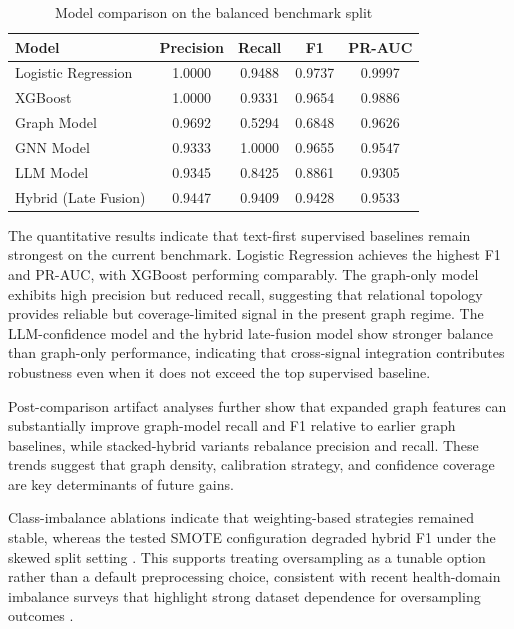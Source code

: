 \documentclass[conference]{Template/IEEEtran}
\begin{document}
\begin{table}[htbp]
\caption{Model comparison on the balanced benchmark split}
\label{tab:benchmark}
\centering
\begin{tabular}{lcccc}
\hline
Model & Precision & Recall & F1 & PR-AUC \\
\hline
Logistic Regression & 1.0000 & 0.9488 & 0.9737 & 0.9997 \\
XGBoost & 1.0000 & 0.9331 & 0.9654 & 0.9886 \\
Graph Model & 0.9692 & 0.5294 & 0.6848 & 0.9626 \\
GNN Model & 0.9333 & 1.0000 & 0.9655 & 0.9547 \\
LLM Model & 0.9345 & 0.8425 & 0.8861 & 0.9305 \\
Hybrid (Late Fusion) & 0.9447 & 0.9409 & 0.9428 & 0.9533 \\
\hline
\end{tabular}
\end{table}

The quantitative results indicate that text-first supervised baselines remain strongest on the current benchmark. Logistic Regression achieves the highest F1 and PR-AUC, with XGBoost \cite{chen2016xgboost} performing comparably. The graph-only model exhibits high precision but reduced recall, suggesting that relational topology provides reliable but coverage-limited signal in the present graph regime. The LLM-confidence model and the hybrid late-fusion model show stronger balance than graph-only performance, indicating that cross-signal integration contributes robustness even when it does not exceed the top supervised baseline.

Post-comparison artifact analyses further show that expanded graph features can substantially improve graph-model recall and F1 relative to earlier graph baselines, while stacked-hybrid variants rebalance precision and recall. These trends suggest that graph density, calibration strategy, and confidence coverage are key determinants of future gains.

Class-imbalance ablations indicate that weighting-based strategies remained stable, whereas the tested SMOTE configuration degraded hybrid F1 under the skewed split setting \cite{chawla2002smote}. This supports treating oversampling as a tunable option rather than a default preprocessing choice, consistent with recent health-domain imbalance surveys that highlight strong dataset dependence for oversampling outcomes \cite{hairani2024smote,medimbalance2024,agyemang2025imbalance}.
\end{document}

